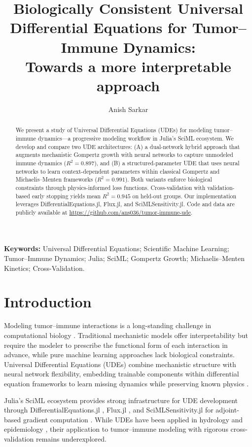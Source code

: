\documentclass{juliacon}
\title{Biologically Consistent Universal Differential Equations for Tumor--Immune Dynamics:\\
Towards a more interpretable approach}
\author[1]{Anish Sarkar}
\affil[1]{Netaji Subhash Engineering College (MAKAUT), ORCID: \href{https://orcid.org/0009-0009-7965-7788}{0009-0009-7965-7788}}
\date{}
\begin{document}
\maketitle

\begin{abstract}
We present a study of Universal Differential Equations (UDEs) for modeling tumor--immune dynamics---a progressive modeling workflow in Julia's SciML ecosystem. We develop and compare two UDE architectures: (A) a dual-network hybrid approach that augments mechanistic Gompertz growth with neural networks to capture unmodeled immune dynamics ($R^2 = 0.897$), and (B) a structured-parameter UDE that uses neural networks to learn context-dependent parameters within classical Gompertz and Michaelis--Menten frameworks ($R^2 = 0.991$). Both variants enforce biological constraints through physics-informed loss functions. Cross-validation with validation-based early stopping yields mean $R^2 = 0.945$ on held-out groups. Our implementation leverages DifferentialEquations.jl, Flux.jl, and SciMLSensitivity.jl. Code and data are publicly available at \url{https://github.com/ans036/tumor-immune-ude}.
\end{abstract}

\noindent\textbf{Keywords:} Universal Differential Equations; Scientific Machine Learning; Tumor--Immune Dynamics; Julia; SciML; Gompertz Growth; Michaelis--Menten Kinetics; Cross-Validation.

\section{Introduction}

Modeling tumor--immune interactions is a long-standing challenge in computational biology \cite{kuznetsov1994,depillis2005validated,vaghi2020gompertz}. Traditional mechanistic models offer interpretability but require the modeler to prescribe the functional form of each interaction in advance, while pure machine learning approaches lack biological constraints. Universal Differential Equations (UDEs) combine mechanistic structure with neural network flexibility, embedding trainable components within differential equation frameworks to learn missing dynamics while preserving known physics \cite{rackauckas2020ude,karniadakis2021physics}.

Julia's SciML ecosystem provides strong infrastructure for UDE development through DifferentialEquations.jl \cite{rackauckas2017de}, Flux.jl \cite{innes2018flux}, and SciMLSensitivity.jl for adjoint-based gradient computation \cite{bezanson2017julia,innes2019differentiable,rackauckas2019diffeqflux}. While UDEs have been applied in hydrology and epidemiology \cite{shen2023differentiable,aboelyazeed2023differentiable,dandekar2020machine}, their application to tumor--immune modeling with rigorous cross-validation remains underexplored.
\end{document}
